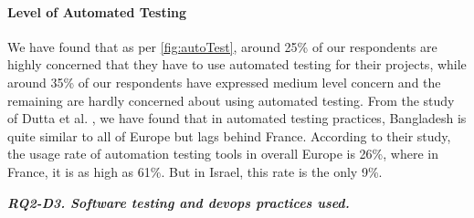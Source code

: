 \paragraph{Level of Automated Testing}
We have found that as per \ref{fig:autoTest}, around 25\% of our respondents are highly concerned that they have to use automated testing for their projects, while around 35\% of our respondents have expressed medium level concern and the remaining are hardly concerned about using automated testing. From the study of Dutta et al. \citep{dutta1999}, we have found that in automated testing practices, Bangladesh is quite similar to all of Europe but lags behind France. According to their study, the usage rate of automation testing tools in overall Europe is 26\%, where in France, it is as high as 61\%. But in Israel, this rate is the only 9\%.

\begin{tcolorbox}[flushleft upper,boxrule=1pt,arc=0pt,left=0pt,right=0pt,top=0pt,bottom=0pt,colback=white,after=\ignorespacesafterend\par\noindent]
\nd\it{\bf{RQ2-D3. Software testing and devops practices used.}} 
\end{tcolorbox}
